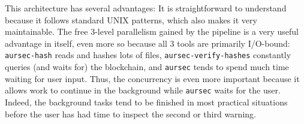 This architecture has several advantages: It is straightforward to understand because it follows standard UNIX patterns, which also makes it very maintainable.
The free 3-level parallelism gained by the pipeline is a very useful advantage in itself, even more so because all 3 tools are primarily I/O-bound: \texttt{aursec-hash} reads and hashes lots of files, \texttt{aursec-verify-hashes} constantly queries (and waits for) the blockchain, and \texttt{aursec} tends to spend much time waiting for user input.
Thus, the concurrency is even more important because it allows work to continue in the background while \texttt{aursec} waits for the user. Indeed, the background tasks tend to be finished in most practical situations before the user has had time to inspect the second or third warning.
